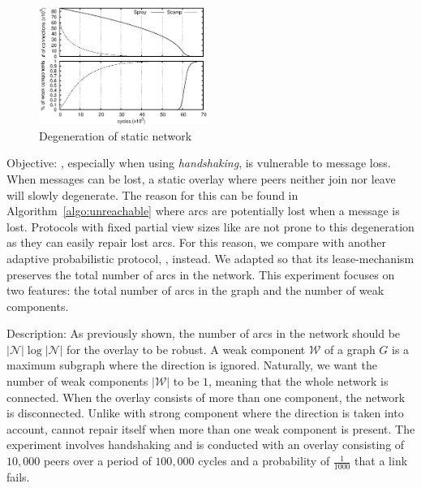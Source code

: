 \begin{figure}
  \centering \includegraphics[width=0.49\textwidth]{img/degen.eps}
  \caption{\label{fig:degen}Degeneration of static network} \end{figure}

\begin{asparadesc} \item[Objective:] \SPRAY{}, especially when using
        \emph{handshaking}, is vulnerable to message loss. When messages can
        be lost, a static \SPRAY{} overlay where peers neither join
        nor leave will slowly degenerate.
        The reason for this can be found in Algorithm~\ref{algo:unreachable} 
        where arcs are potentially lost when a message is lost.
        Protocols with fixed partial view sizes like \CYCLON{} are not prone 
        to this degeneration as they can easily repair lost arcs.
        For this reason, we compare with another adaptive probabilistic protocol,
        \SCAMP{}, instead. We adapted \SCAMP{} so that its lease-mechanism preserves
        the total number of arcs in the network.
        This experiment focuses on two features: the total number of arcs in the 
        graph and the number of weak components.
\item[Description:]
    As previously shown, the number of arcs in the network should be
    $|\mathcal{N}|\log{|\mathcal{N}|}$ for the overlay to be robust. A weak
    component $\mathcal{W}$ of a graph $G$ is a maximum subgraph where the direction
    is ignored.
    Naturally, we want the number of weak components $|\mathcal{W}|$ to be $1$,
    meaning that the whole network is connected.
    When the overlay consists of more than one component, the network is disconnected.
    Unlike with strong component where the direction is taken into account, \SPRAY{}
    cannot repair itself when more than one weak component is present.
    The experiment involves handshaking and is conducted with an overlay consisting
    of $10,000$ peers over a period of $100,000$ cycles and a probability of
    $\frac{1}{1000}$ that a link fails. 


\end{asparadesc}
